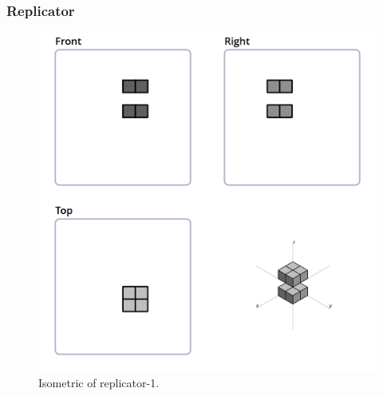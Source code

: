 \subsubsection{Replicator}
\begin{figure}
	\centering
	\includegraphics[scale=0.4]{iso_settings/puffer_1.png}
	\caption{Isometric of replicator-1.}
  \label{fig:iso-puffer-1}
\end{figure}

